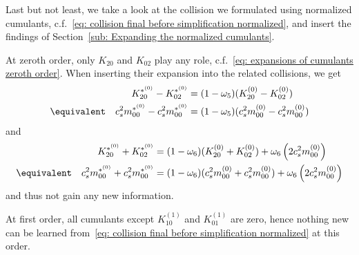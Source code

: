 Last but not least, we take a look at the collision we formulated using normalized cumulants, c.f.~\eqref{eq: collision final before simplification normalized},
and insert the findings of Section~\ref{sub: Expanding the normalized cumulants}.

At zeroth order, only $K_{20}$ and $K_{02}$ play any role, c.f.~\eqref{eq: expansions of cumulants zeroth order}.
When inserting their expansion into the related collisions, we get
\begin{equation}
  \begin{aligned}
    &&K_{20}^{*^{(0)}} - K_{02}^{*^{(0)}}
      & = (1-\omega_5) (K_{20}^{(0)} - K_{02}^{(0)}) \\
    &\equivalent& c_s^2 m_{00}^{*^{(0)}} - c_s^2 m_{00}^{*^{(0)}}
        & = (1-\omega_5) (c_s^2 m_{00}^{(0)} - c_s^2 m_{00}^{(0)})
  \end{aligned}
\end{equation}
and
\begin{equation}
  \begin{aligned}
    &&K_{20}^{*^{(0)}} + K_{02}^{*^{(0)}}
      & = (1-\omega_6)(K_{20}^{(0)} + K_{02}^{(0)}) + \omega_6 \left( 2 c_s^2 m_{00}^{(0)} \right) \\
    &\equivalent& c_s^2 m_{00}^{*^{(0)}} + c_s^2 m_{00}^{*^{(0)}}
      & = (1-\omega_6)(c_s^2 m_{00}^{(0)} + c_s^2 m_{00}^{(0)}) + \omega_6 \left( 2 c_s^2 m_{00}^{(0)} \right) \\
  \end{aligned}
\end{equation}
and thus not gain any new information.

At first order, all cumulants except $K_{10}^{(1)}$ and $K_{01}^{(1)}$ are zero, hence nothing new can be learned from~\eqref{eq: collision final before simplification normalized} at this order.

